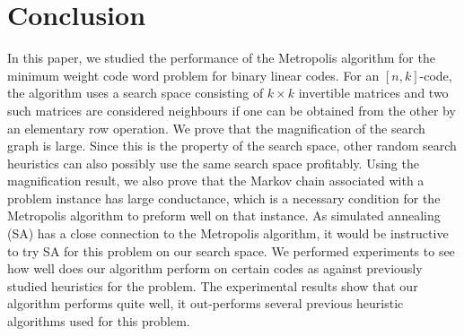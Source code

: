 \documentclass{sig-alternate-2013}
\begin{document}
\section{Conclusion}

In this paper, we studied the performance of the Metropolis algorithm
for the minimum weight code word problem for binary linear codes. For
an $[n,k]$-code, the algorithm uses a search space consisting of
$k\times k$ invertible matrices and two such matrices are considered
neighbours if one can be obtained from the other by an elementary row
operation. We prove that the magnification of the search graph is
large. Since this is the property of the search space, other random
search heuristics can also possibly use the same search space
profitably. Using the magnification result, we also prove that the
Markov chain associated with a problem instance has large conductance,
which is a necessary condition for the Metropolis algorithm to preform
well on that instance. As simulated annealing (SA) has a close
connection to the Metropolis algorithm, it would be instructive to try
SA for this problem on our search space. We performed experiments to
see how well does our algorithm perform on certain codes as against
previously studied heuristics for the problem.  The experimental
results show that our algorithm performs quite well, it out-performs
several previous heuristic algorithms used for this problem.

%


%
%
\end{document}
